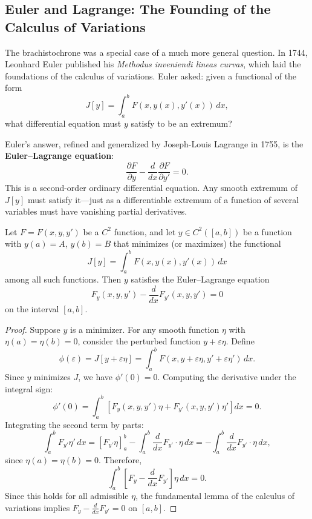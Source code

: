 \subsection{Euler and Lagrange: The Founding of the Calculus of Variations}

The brachistochrone was a special case of a much more general question. In 1744, Leonhard Euler published his \emph{Methodus inveniendi lineas curvas}, which laid the foundations of the calculus of variations. Euler asked: given a functional of the form
\[
    J[y] = \int_a^b F(x, y(x), y'(x)) \, dx,
\]
what differential equation must $y$ satisfy to be an extremum?

Euler's answer, refined and generalized by Joseph-Louis Lagrange in 1755, is the \textbf{Euler--Lagrange equation}:
\[
    \frac{\partial F}{\partial y} - \frac{d}{dx}\frac{\partial F}{\partial y'} = 0.
\]
This is a second-order ordinary differential equation. Any smooth extremum of $J[y]$ must satisfy it---just as a differentiable extremum of a function of several variables must have vanishing partial derivatives.

\begin{theorem}
\label{thm:euler-lagrange}
Let $F = F(x, y, y')$ be a $C^2$ function, and let $y \in C^2([a,b])$ be a function with $y(a) = A$, $y(b) = B$ that minimizes (or maximizes) the functional
\[
    J[y] = \int_a^b F(x, y(x), y'(x)) \, dx
\]
among all such functions. Then $y$ satisfies the Euler--Lagrange equation
\[
    F_y(x, y, y') - \frac{d}{dx} F_{y'}(x, y, y') = 0
\]
on the interval $[a, b]$.
\end{theorem}

\begin{proof}
Suppose $y$ is a minimizer. For any smooth function $\eta$ with $\eta(a) = \eta(b) = 0$, consider the perturbed function $y + \varepsilon \eta$. Define
\[
    \phi(\varepsilon) = J[y + \varepsilon \eta] = \int_a^b F(x, y + \varepsilon \eta, y' + \varepsilon \eta') \, dx.
\]
Since $y$ minimizes $J$, we have $\phi'(0) = 0$. Computing the derivative under the integral sign:
\[
    \phi'(0) = \int_a^b \left[ F_y(x, y, y') \eta + F_{y'}(x, y, y') \eta' \right] dx = 0.
\]
Integrating the second term by parts:
\[
    \int_a^b F_{y'} \eta' \, dx = \left[ F_{y'} \eta \right]_a^b - \int_a^b \frac{d}{dx} F_{y'} \cdot \eta \, dx = -\int_a^b \frac{d}{dx} F_{y'} \cdot \eta \, dx,
\]
since $\eta(a) = \eta(b) = 0$. Therefore,
\[
    \int_a^b \left[ F_y - \frac{d}{dx} F_{y'} \right] \eta \, dx = 0.
\]
Since this holds for all admissible $\eta$, the fundamental lemma of the calculus of variations implies $F_y - \frac{d}{dx} F_{y'} = 0$ on $[a,b]$.
\end{proof}

